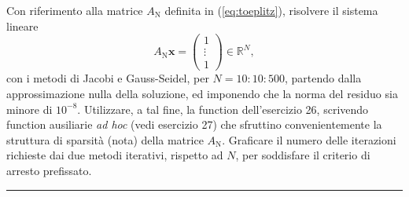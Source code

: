 Con riferimento alla matrice $A_\mathrm{N}$ definita in (\ref{eq:toeplitz}), risolvere il sistema lineare $$A_\mathrm{N}\textbf{x} = \begin{pmatrix}1 \\ \vdots \\ 1\end{pmatrix} \in\mathbb{R}^{N}, $$
con i metodi di Jacobi e Gauss-Seidel, per $N = 10 : 10 : 500$, partendo dalla approssimazione nulla della soluzione, ed imponendo che la norma del residuo sia minore di $10^{-8}$. Utilizzare, a tal fine, la function dell'esercizio 26, scrivendo function ausiliarie \textit{ad hoc} (vedi esercizio 27) che sfruttino convenientemente la struttura di sparsità (nota) della matrice $A_\mathrm{N}$. Graficare il numero delle iterazioni richieste dai due metodi iterativi, rispetto ad $N$, per soddisfare il criterio di arresto prefissato.
\hspace*{\fill}
\par\noindent\rule{\textwidth}{0.4pt}
\hspace*{\fill}

